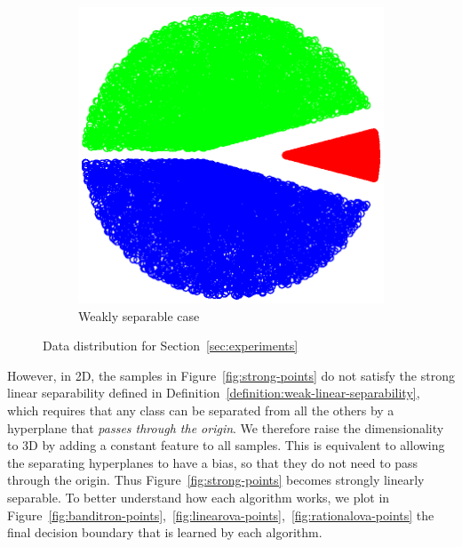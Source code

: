 \begin{figure}[h]
\begin{subfigure}[b]{0.23\textwidth}
        \hspace*{-0.3cm}  \includegraphics[width=1.15\textwidth, trim={0, 0cm, 0, 0}, clip]{figures/weak_points}
         \caption{Weakly separable case}
    \end{subfigure}
    \vspace*{-0.2cm}
    \caption{Data distribution for Section~\ref{sec:experiments}}
\end{figure}

However, in 2D, the samples in Figure~\ref{fig:strong-points} do not satisfy the strong linear separability defined in Definition~\ref{definition:weak-linear-separability}, which requires that any class can be separated from all the others by a hyperplane that \textit{passes through the origin}. We therefore raise the dimensionality to 3D by adding a constant feature to all samples. This is equivalent to allowing the separating hyperplanes to have a bias, so that they do not need to pass through the origin. Thus Figure~\ref{fig:strong-points} becomes strongly linearly separable. To better understand how each algorithm works, we plot in Figure~\ref{fig:banditron-points},~\ref{fig:linearova-points},~\ref{fig:rationalova-points} the final decision boundary that is learned by each algorithm. 

